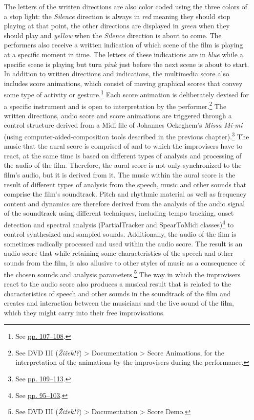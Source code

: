 The letters of the written directions are also color coded using the three colors of a stop light: the \emph{Silence} direction is always in \emph{red} meaning they should stop playing at that point, the other directions are displayed in \emph{green} when they should play and \emph{yellow} when the \emph{Silence} direction is about to come. The performers also receive a written indication of which scene of the film is playing at a specific moment in time. The letters of these indications are in \emph{blue} while a specific scene is playing but turn \emph{pink} just before the next scene is about to start. In addition to written directions and indications, the multimedia score also includes score animations, which consist of moving graphical scores that convey some type of activity or gesture.\footnote{See \hyperlink{algoanimation}{pp. 107--108}.} Each score animation is deliberately devised for a specific instrument and is open to interpretation by the performer.\footnote{See DVD III (\emph{\v{Z}i\v{z}ek!?}) \tiny \textgreater \footnotesize \hspace{0pt} Documentation \tiny \textgreater \footnotesize \hspace{0pt} Score Animations, for the interpretation of the animations by the improvisers during the performance.} The written directions, audio score and score animations are triggered through a control structure derived from a Midi file of Johannes Ockeghem's \emph{Missa Mi-mi} (using computer-aided-composition tools described in the previous chapter).\footnote{See \hyperlink{compueraided}{pp. 109--113}.} The music that the aural score is comprised of and to which the improvisers have to react, at the same time is based on different types of analysis and processing of the audio of the film. Therefore, the aural score is not only synchronized to the film's audio, but it is derived from it. The music within the aural score is the result of different types of analysis from the speech, music and other sounds that comprise the film's soundtrack. Pitch and rhythmic material as well as frequency content and dynamics are therefore derived from the analysis of the audio signal of the soundtrack using different techniques, including tempo tracking, onset detection and spectral analysis (PartialTracker and SpearToMidi classes)\footnote{See \hyperlink{spectrack}{pp. 95--103}.} to control synthesized and sampled sounds. Additionally, the audio of the film is sometimes radically processed and used within the audio score. The result is an audio score that while retaining some characteristics of the speech and other sounds from the film, is also allusive to other styles of music as a consequence of the chosen sounds and analysis parameters.\footnote{See DVD III (\emph{\v{Z}i\v{z}ek!?}) \tiny \textgreater \footnotesize \hspace{0pt} Documentation \tiny \textgreater \footnotesize \hspace{0pt} Score Demo.} The way in which the improvisers react to the audio score also produces a musical result that is related to the characteristics of speech and other sounds in the soundtrack of the film and creates and interaction between the musicians and the live sound of the film, which they might carry into their free improvisations.

